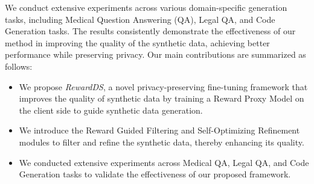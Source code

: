 We conduct extensive experiments across various domain-specific generation tasks, including Medical Question Answering (QA), Legal QA, and Code Generation tasks. 
The results consistently demonstrate the effectiveness of our method in improving the quality of the synthetic data, achieving better performance while preserving privacy.
Our main contributions are summarized as follows:

\begin{itemize}[topsep=0.2em, partopsep=0em, itemsep=0.5em, parsep=0em, leftmargin=2em]
    \item We propose \textit{RewardDS}, a novel privacy-preserving fine-tuning framework that improves the quality of synthetic data by training a Reward Proxy Model on the client side to guide synthetic data generation. 
    \item We introduce the Reward Guided Filtering and Self-Optimizing Refinement modules to filter and refine the synthetic data, thereby enhancing its quality.
    \item We conducted extensive experiments across Medical QA, Legal QA, and Code Generation tasks to validate the effectiveness of our proposed framework.
\end{itemize}





